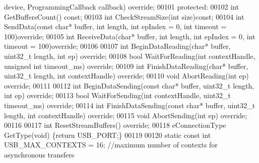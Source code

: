 \begin{DoxyCode}
      device, ProgrammingCallback callback) \textcolor{keyword}{override};
00101 \textcolor{keyword}{protected}:
00102     \textcolor{keywordtype}{int} GetBuffersCount() \textcolor{keyword}{const};
00103     \textcolor{keywordtype}{int} CheckStreamSize(\textcolor{keywordtype}{int} size)\textcolor{keyword}{const};
00104     \textcolor{keywordtype}{int} SendData(\textcolor{keyword}{const} \textcolor{keywordtype}{char}* buffer, \textcolor{keywordtype}{int} length, \textcolor{keywordtype}{int} epIndex = 0, \textcolor{keywordtype}{int} timeout = 100)\textcolor{keyword}{override};
00105     \textcolor{keywordtype}{int} ReceiveData(\textcolor{keywordtype}{char}* buffer, \textcolor{keywordtype}{int} length, \textcolor{keywordtype}{int} epIndex = 0, \textcolor{keywordtype}{int} timeout = 100)\textcolor{keyword}{override};
00106 
00107     \textcolor{keywordtype}{int} BeginDataReading(\textcolor{keywordtype}{char}* buffer, uint32\_t length, \textcolor{keywordtype}{int} ep) \textcolor{keyword}{override};
00108     \textcolor{keywordtype}{bool} WaitForReading(\textcolor{keywordtype}{int} contextHandle, \textcolor{keywordtype}{unsigned} \textcolor{keywordtype}{int} timeout_ms) \textcolor{keyword}{override};
00109     \textcolor{keywordtype}{int} FinishDataReading(\textcolor{keywordtype}{char}* buffer, uint32\_t length, \textcolor{keywordtype}{int} contextHandle) \textcolor{keyword}{override};
00110     \textcolor{keywordtype}{void} AbortReading(\textcolor{keywordtype}{int} ep) \textcolor{keyword}{override};
00111 
00112     \textcolor{keywordtype}{int} BeginDataSending(\textcolor{keyword}{const} \textcolor{keywordtype}{char}* buffer, uint32\_t length, \textcolor{keywordtype}{int} ep) \textcolor{keyword}{override};
00113     \textcolor{keywordtype}{bool} WaitForSending(\textcolor{keywordtype}{int} contextHandle, uint32\_t timeout\_ms) \textcolor{keyword}{override};
00114     \textcolor{keywordtype}{int} FinishDataSending(\textcolor{keyword}{const} \textcolor{keywordtype}{char}* buffer, uint32\_t length, \textcolor{keywordtype}{int} contextHandle) \textcolor{keyword}{override};
00115     \textcolor{keywordtype}{void} AbortSending(\textcolor{keywordtype}{int} ep) \textcolor{keyword}{override};
00116 
00117     \textcolor{keywordtype}{int} ResetStreamBuffers() \textcolor{keyword}{override};
00118     eConnectionType GetType(\textcolor{keywordtype}{void}) \{\textcolor{keywordflow}{return} USB\_PORT;\}
00119     
00120     \textcolor{keyword}{static} \textcolor{keyword}{const} \textcolor{keywordtype}{int} USB\_MAX\_CONTEXTS = 16; \textcolor{comment}{//maximum number of contexts for asynchronous transfers}

\end{DoxyCode}
